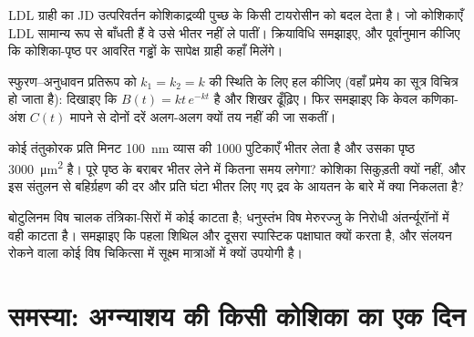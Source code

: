 \begin{exercise}[$\star\star$]\label{exo:b3:membrane-traffic:9}
LDL ग्राही का JD उत्परिवर्तन कोशिकाद्रव्यी पुच्छ के किसी टायरोसीन को
बदल देता है। जो कोशिकाएँ LDL सामान्य रूप से बाँधती हैं वे उसे भीतर नहीं
ले पातीं। क्रियाविधि समझाइए, और पूर्वानुमान कीजिए कि कोशिका-पृष्ठ पर
आवरित गड्ढों के सापेक्ष ग्राही कहाँ मिलेंगे।
\end{exercise}

\begin{exercise}[$\star\star\star$]\label{exo:b3:membrane-traffic:10}
स्फुरण--अनुधावन प्रतिरूप को $k_{1} = k_{2} = k$ की स्थिति के लिए हल
कीजिए (वहाँ प्रमेय का सूत्र विचित्र हो जाता है): दिखाइए कि $B(t) = kt\,e^{-kt}$
है और शिखर ढूँढ़िए। फिर समझाइए कि केवल कणिका-अंश
$C(t)$ मापने से दोनों दरें अलग-अलग क्यों तय नहीं की जा सकतीं।
\end{exercise}

\begin{exercise}[$\star\star\star$]\label{exo:b3:membrane-traffic:11}
कोई तंतुकोरक प्रति मिनट \qty{100}{nm} व्यास की \num{1000} 
पुटिकाएँ भीतर लेता है और उसका पृष्ठ \qty{3000}{\micro m^2} है। पूरे
पृष्ठ के बराबर भीतर लेने में कितना समय लगेगा? कोशिका सिकुड़ती क्यों
नहीं, और इस संतुलन से बहिर्ग्रहण की दर और प्रति घंटा भीतर लिए गए द्रव
के आयतन के बारे में क्या निकलता है?
\end{exercise}

\begin{exercise}[$\star\star\star$]\label{exo:b3:membrane-traffic:12}
बोटुलिनम विष चालक तंत्रिका-सिरों में कोई  काटता है; धनुस्तंभ विष
मेरुरज्जु के निरोधी अंतर्न्यूरॉनों में वही  काटता है। समझाइए कि
पहला शिथिल और दूसरा स्पास्टिक पक्षाघात क्यों करता है, और संलयन रोकने
वाला कोई विष चिकित्सा में सूक्ष्म मात्राओं में क्यों उपयोगी है।
\end{exercise}

\section{समस्या: अग्न्याशय की किसी कोशिका का एक दिन}

